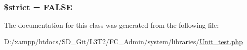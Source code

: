 \subsubsection[{\$strict}]{\setlength{\rightskip}{0pt plus 5cm}\$strict = F\+A\+L\+S\+E}\label{class_c_i___unit__test_a856bf794dded1ba70be4dfae635a1b06}


The documentation for this class was generated from the following file\+:\begin{DoxyCompactItemize}
\item 
D\+:/xampp/htdocs/\+S\+D\+\_\+\+Git/\+L3\+T2/\+F\+C\+\_\+\+Admin/system/libraries/\hyperlink{_unit__test_8php}{Unit\+\_\+test.\+php}\end{DoxyCompactItemize}
